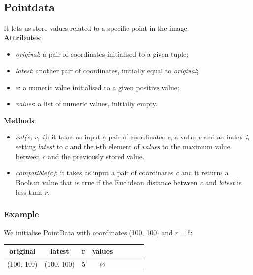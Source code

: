 \documentclass[a4paper,12pt,oneside]{book}
\begin{document}
\begin{onehalfspace}
	\subsection{Pointdata}
	    \setlength\itemsep{0em}
	    It lets us store values related to a specific point in the image. \\
    	\textbf{Attributes}: 
    	\begin{itemize}
    	    \setlength\itemsep{0em}
        	\item \textit{original}: a pair of coordinates initialised to a given tuple;
        	\item \textit{latest}: another pair of coordinates, initially equal to \textit{original};
        	\item \textit{r}: a numeric value initialised to a given positive value;
        	\item \textit{values}: a list of numeric values, initially empty.
    	\end{itemize}
    	\textbf{Methods}:
    	\begin{itemize}
    	\item \textit{set(c, v, i)}: it takes as input a pair of coordinates \textit{c}, a value \textit{v} and an index \textit{i}, setting \textit{latest} to \textit{c} and the i-th element of \textit{values} to the maximum value between \textit{c} and the previously stored value.
    	\item \textit{compatible(c)}: it takes as input a pair of coordinates \textit{c} and it returns a Boolean value that is true if the
    	Euclidean distance between \textit{c} and \textit{latest} is less than \textit{r}.
    	\end{itemize}
    	
    	\newpage
    	\subsubsection{Example}
    	We initialise PointData with coordinates (100, 100) and $r=5$: 
    
    	\begin{table}[!h]
            \centering
            \begin{tabular}{*8c}
            \toprule
           \textbf{original} & \textbf{latest} & \textbf{r} & \textbf{values}\\
            \midrule
            (100, 100) & (100, 100) & 5 & $\varnothing$ \\
            \bottomrule
            \end{tabular}
        \end{table} 
    	

\end{onehalfspace}
\end{document}
